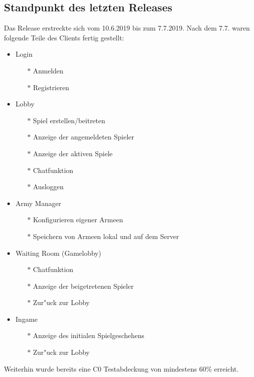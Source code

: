 \documentclass[12pt, titlepage]{scrartcl}
\newcommand{\RN}[1]{%
	\textup{\uppercase\expandafter{\romannumeral#1}}%
}
\begin{document}
        \subsection{Standpunkt des letzten Releases}
            Das Release \RN{2} erstreckte sich vom 10.6.2019 bis zum 7.7.2019. Nach dem 7.7. waren folgende Teile des Clients fertig gestellt:
            \begin{itemize}
                \item Login
                \begin{itemize}
                    \item[$\ast$] Anmelden
                    \item[$\ast$] Registrieren
                \end{itemize}
                \item Lobby
                \begin{itemize}
                    \item[$\ast$] Spiel erstellen/beitreten
                    \item[$\ast$] Anzeige der angemeldeten Spieler 
                    \item[$\ast$] Anzeige der aktiven Spiele
                    \item[$\ast$] Chatfunktion
                    \item[$\ast$] Ausloggen
                \end{itemize}
                \item Army Manager
                \begin{itemize}
                    \item[$\ast$] Konfigurieren eigener Armeen
                    \item[$\ast$] Speichern von Armeen lokal und auf dem Server
                \end{itemize}
                \item Waiting Room (Gamelobby)
                \begin{itemize}
                    \item[$\ast$] Chatfunktion
                    \item[$\ast$] Anzeige der beigetretenen Spieler 
                    \item[$\ast$] Zur"uck zur Lobby
                \end{itemize}
                \item Ingame
                \begin{itemize}
                    \item[$\ast$] Anzeige des initialen Spielgeschehens
                    \item[$\ast$] Zur"uck zur Lobby
                \end{itemize}
            \end{itemize}
            Weiterhin wurde bereits eine C0 Testabdeckung von mindestens 60\% erreicht.
\end{document}
